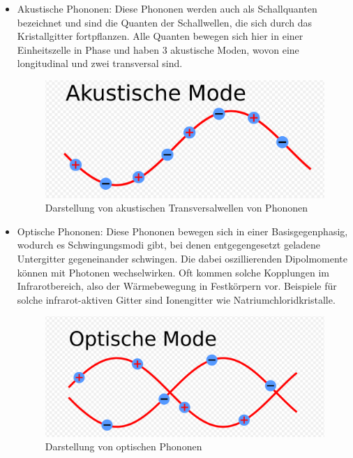 \documentclass[a4paper, 11pt, ngerman, parskip=half-]{scrartcl}
\begin{document}
\begin{itemize}
    \item Akustische Phononen: Diese Phononen werden auch als Schallquanten bezeichnet und sind die Quanten der Schallwellen, die sich durch das Kristallgitter fortpflanzen.
          Alle Quanten bewegen sich hier in einer Einheitszelle in Phase und haben 3 akustische Moden, wovon eine longitudinal und zwei transversal sind.

          \begin{figure}[H]
            \includegraphics[width=0.8\linewidth]{resources/09-05-2012/akust.PNG}
            \caption{Darstellung von akustischen Transversalwellen von Phononen}
          \end{figure}
    \item Optische Phononen: Diese Phononen bewegen sich in einer Basisgegenphasig, wodurch es Schwingungsmodi gibt, bei denen entgegengesetzt geladene Untergitter gegeneinander schwingen. 
          Die dabei oszillierenden Dipolmomente können mit Photonen wechselwirken. Oft kommen solche Kopplungen im Infrarotbereich, also der Wärmebewegung in Festkörpern vor.
          Beispiele für solche infrarot-aktiven Gitter sind Ionengitter wie Natriumchloridkristalle.

          \begin{figure}[H]
            \includegraphics[width=0.8\linewidth]{resources/09-05-2012/opt.PNG}
            \caption{Darstellung von optischen Phononen}
          \end{figure}
\end{itemize}
\end{document}
